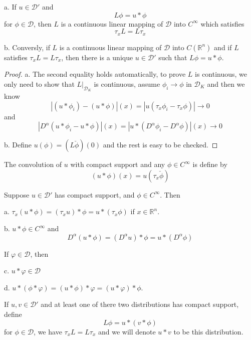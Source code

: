\documentclass[lang=en, color=blue, ]{elegantbook}
\newcommand{\R}{\mathbb{R}}
\newcommand{\D}{\mathscr{D}}
\begin{document}
\begin{theorem}
    a. If $u\in\D'$ and
    \[L\phi = u*\phi\]
    for $\phi \in \D$, then $L$ is a continuous linear mapping of $\D$ into $C^{\infty}$ which satisfies
    \[\tau_xL = L\tau_x\]\par
    b. Conversly, if $L$ is a continuous linear mapping of $\D$ into $C(\R^n)$ and if $L$ satisfies $\tau_x L = L\tau_x$, then there is a unique $u\in\D'$ such that $L\phi = u*\phi$.
\end{theorem}
\begin{proof}
    a. The second equality holds automatically, to prove $L$ is continuous, we only need to show that $L|_{\D_K}$ is continuous, assume $\phi_i \to \phi$ in $\D_K$ and then we know
    \[
    |(u*\phi_i)-(u*\phi)|(x) = |u(\tau_x\phi_i - \tau_x\phi)| \to 0
    \]
    and
    \[
    |D^{\alpha}(u*\phi_i - u*\phi)|(x) = |u*(D^{\alpha}\phi_i - D^{\alpha}\phi)|(x) \to 0 
    \]\par
    b. Define $u(\phi) = (L\check{\phi})(0)$ and the rest is easy to be checked.
\end{proof}

\begin{definition}
    The convolution of $u$ with compact support and any $\phi\in C^{\infty}$ is define by
    \[
    (u*\phi)(x) = u(\tau_x\check{\phi})
    \]
\end{definition}
\begin{theorem}
    Suppose $u\in\D'$ has compact support, and $\phi \in C^{\infty}$. Then\par
    a. $\tau_x(u*\phi) = (\tau_x u)*\phi = u*(\tau_x\phi)$ if $x\in\R^n$.\par
    b. $u*\phi \in C^{\infty}$ and
        \[D^{\alpha}(u*\phi) = (D^{\alpha}u)*\phi = u*(D^{\alpha}\phi)\]\par
    If $\varphi \in \D$, then\par
    c. $u*\varphi \in \D$\par
    d. $u*(\phi*\varphi) = (u*\phi)*\varphi = (u*\varphi)*\phi$.
\end{theorem}

\begin{definition}
    If $u,v\in \D'$ and at least one of there two distributions has compact support, define
    \[L\phi = u*(v*\phi)\]
    for $\phi \in \D$, we have $\tau_xL = L\tau_x$ and we will denote $u*v$ to be this distribution.
\end{definition}
\end{document}
